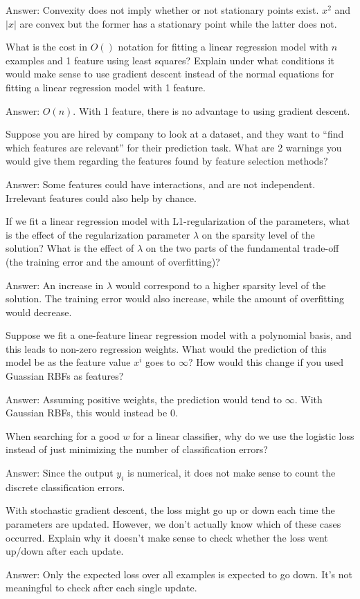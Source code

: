 \documentclass{article}
\def\ans#1{\par\gre{Answer: #1}}
\def\gre#1{{\color{gre}#1}}
\begin{document}
{{\ans{
Convexity does not imply whether or not stationary points exist.
$x^2$ and $|x|$ are convex but the former has a stationary point
while the latter does not.
}
\item What is the cost in $O()$ notation for fitting a linear regression model with $n$ examples and 1 feature using least squares? Explain under what conditions it would make sense to use gradient descent instead of the normal equations for fitting a linear regression model with 1 feature.
\ans{
$O(n)$. With 1 feature, there is no advantage to using gradient descent.
}
\item Suppose you are hired by company to look at a dataset, and they want to ``find which features are relevant'' for their prediction task. What are 2 warnings you would give them regarding the features found by feature selection methods?
\ans{
Some features could have interactions, and are not independent. Irrelevant features could also help by chance.
}
\pagebreak
\item If we fit a linear regression model with L1-regularization of the parameters, what is the effect of the regularization parameter $\lambda$ on the sparsity level of the solution? What is the effect of $\lambda$ on the two parts of the fundamental trade-off (the training error and the amount of overfitting)?
\ans{
An increase in $\lambda$ would correspond to a higher sparsity level of the solution.
The training error would also increase, while the amount of overfitting would decrease.
}
\item Suppose we fit a one-feature linear regression model with a polynomial basis, and this leads to non-zero regression weights. What would the prediction of this model be as the feature value $x^i$ goes to $\infty$? How would this change if you used Guassian RBFs as features?
\ans{
Assuming positive weights, the prediction would tend to $\infty$.
With Gaussian RBFs, this would instead be 0.
}
\item When searching for a good $w$ for a linear classifier, why do we use the logistic loss instead of just minimizing the number of classification errors? 
\ans{
Since the output $y_i$ is numerical, it does not make sense to count the discrete classification errors.
}
\item With stochastic gradient descent, the loss might go up or down each time the parameters are updated. However, we don't actually know which of these cases occurred. Explain why it doesn't make sense to check whether the loss went up/down after each update.
\ans{
Only the expected loss over all examples is expected to go down. It's not meaningful to check after each single update.
}}}
\end{document}
